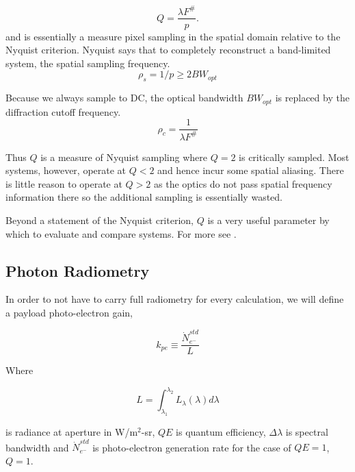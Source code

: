 \documentclass[]{spieman}  %
\begin{document}
\begin{equation}
Q = \frac{\lambda F^\#}{p}.
\label{eq:Q}
\end{equation}
and is essentially a measure pixel sampling in the spatial domain relative to the Nyquist criterion.  Nyquist says that to completely reconstruct a band-limited system, the spatial sampling frequency. 
\begin{equation*}
    \rho_s = 1/p \geq 2 BW_{opt}
\end{equation*}

Because we always sample to DC, the optical bandwidth $BW_{opt}$ is replaced by the diffraction cutoff frequency.
\begin{equation*}
    \rho_c = \frac{1}{\lambda F^\#}
\end{equation*}

Thus $Q$ is a measure of Nyquist sampling where $Q=2$ is critically sampled.  Most systems, however, operate at $Q < 2$ and hence incur some spatial aliasing.  There is little reason to operate at $Q > 2$ as the optics do not pass spatial frequency information there so the additional sampling is essentially wasted.


Beyond a statement of the Nyquist criterion, $Q$ is a very useful parameter by which to evaluate and compare systems.  For more see \cite{fiete_q}.  

\subsection{Photon Radiometry}

In order to not have to carry full radiometry for every calculation, we will define a payload photo-electron gain, 

\begin{equation}
k_{pe} \equiv \frac{\dot{N}_{e^-}^{std}}{L}
\label{eq:k_pe}
\end{equation}

Where 

\begin{equation*}
    L = \int_{\lambda_1}^{\lambda_2}L_{\lambda}(\lambda)d\lambda
\end{equation*}

is radiance at aperture in W/m$^2$-sr, $QE$ is quantum efficiency, $\Delta \lambda$ is spectral bandwidth and $\dot{N}_{e^-}^{std}$ is photo-electron generation rate for the case of $QE=1$, $Q=1$.
\end{document}

